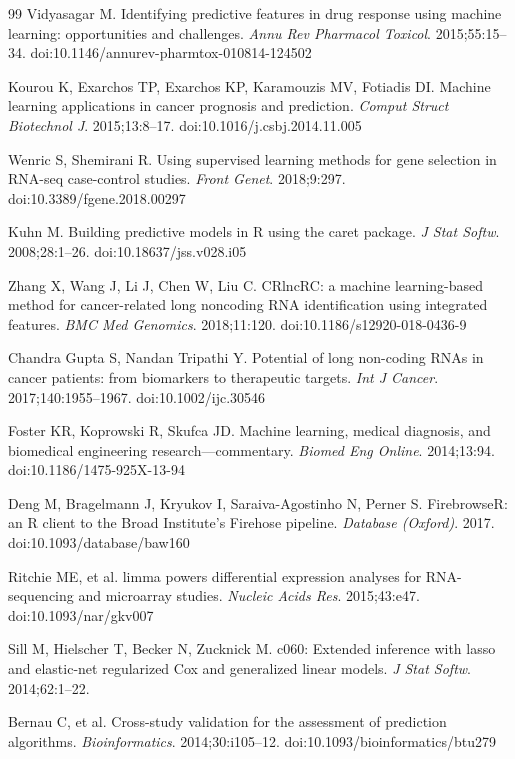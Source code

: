 \documentclass[12pt,a4paper]{article}
\begin{document}
\begin{thebibliography}{99}
 Vidyasagar M. Identifying predictive features in drug response using machine learning: opportunities and challenges. \textit{Annu Rev Pharmacol Toxicol}. 2015;55:15--34. doi:10.1146/annurev-pharmtox-010814-124502

 Kourou K, Exarchos TP, Exarchos KP, Karamouzis MV, Fotiadis DI. Machine learning applications in cancer prognosis and prediction. \textit{Comput Struct Biotechnol J}. 2015;13:8--17. doi:10.1016/j.csbj.2014.11.005

 Wenric S, Shemirani R. Using supervised learning methods for gene selection in RNA-seq case-control studies. \textit{Front Genet}. 2018;9:297. doi:10.3389/fgene.2018.00297

 Kuhn M. Building predictive models in R using the caret package. \textit{J Stat Softw}. 2008;28:1--26. doi:10.18637/jss.v028.i05

 Zhang X, Wang J, Li J, Chen W, Liu C. CRlncRC: a machine learning-based method for cancer-related long noncoding RNA identification using integrated features. \textit{BMC Med Genomics}. 2018;11:120. doi:10.1186/s12920-018-0436-9

 Chandra Gupta S, Nandan Tripathi Y. Potential of long non-coding RNAs in cancer patients: from biomarkers to therapeutic targets. \textit{Int J Cancer}. 2017;140:1955--1967. doi:10.1002/ijc.30546

 Foster KR, Koprowski R, Skufca JD. Machine learning, medical diagnosis, and biomedical engineering research---commentary. \textit{Biomed Eng Online}. 2014;13:94. doi:10.1186/1475-925X-13-94

 Deng M, Bragelmann J, Kryukov I, Saraiva-Agostinho N, Perner S. FirebrowseR: an R client to the Broad Institute's Firehose pipeline. \textit{Database (Oxford)}. 2017. doi:10.1093/database/baw160

 Ritchie ME, et al. limma powers differential expression analyses for RNA-sequencing and microarray studies. \textit{Nucleic Acids Res}. 2015;43:e47. doi:10.1093/nar/gkv007

 Sill M, Hielscher T, Becker N, Zucknick M. c060: Extended inference with lasso and elastic-net regularized Cox and generalized linear models. \textit{J Stat Softw}. 2014;62:1--22.

 Bernau C, et al. Cross-study validation for the assessment of prediction algorithms. \textit{Bioinformatics}. 2014;30:i105--12. doi:10.1093/bioinformatics/btu279


\end{thebibliography}
\end{document}
